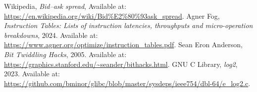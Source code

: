\documentclass[11pt]{article}
\begin{document}
\begin{thebibliography}{9}

Wikipedia, \textit{Bid–ask spread}, Available at: \url{https://en.wikipedia.org/wiki/Bid%E2%80%93ask_spread}.
Agner Fog, \textit{Instruction Tables: Lists of instruction latencies, throughputs and micro-operation breakdowns}, 2024. Available at: \url{https://www.agner.org/optimize/instruction_tables.pdf}.
Sean Eron Anderson, \textit{Bit Twiddling Hacks}, 2005. Available at: \url{https://graphics.stanford.edu/~seander/bithacks.html}.
GNU C Library, \textit{log2}, 2023. Available at: \url{https://github.com/bminor/glibc/blob/master/sysdeps/ieee754/dbl-64/e_log2.c}.

\end{thebibliography}
\end{document}
